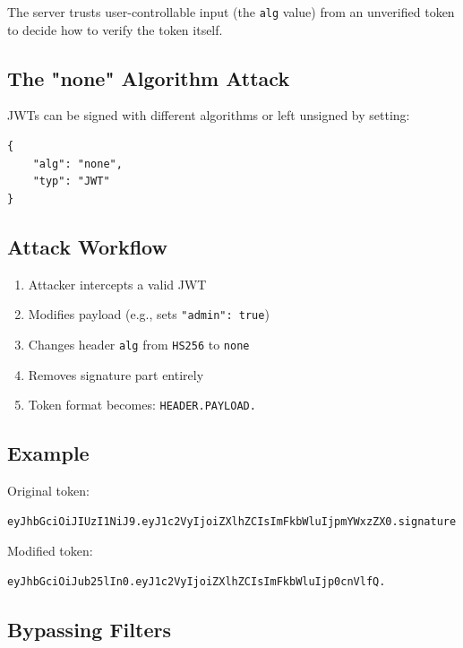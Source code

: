 \documentclass{article}
\begin{document}
\begin{attackbox}
The server trusts user-controllable input (the \texttt{alg} value) from an unverified token to decide how to verify the token itself.
\end{attackbox}

\subsection{The "none" Algorithm Attack}

JWTs can be signed with different algorithms or left unsigned by setting:

\begin{lstlisting}[caption=Unsecured JWT Header]
{
    "alg": "none",
    "typ": "JWT"
}
\end{lstlisting}

\subsection{Attack Workflow}

\begin{enumerate}
    \item Attacker intercepts a valid JWT
    \item Modifies payload (e.g., sets \texttt{"admin": true})
    \item Changes header \texttt{alg} from \texttt{HS256} to \texttt{none}
    \item Removes signature part entirely
    \item Token format becomes: \texttt{HEADER.PAYLOAD.}
\end{enumerate}

\subsection{Example}

Original token:
\begin{verbatim}
eyJhbGciOiJIUzI1NiJ9.eyJ1c2VyIjoiZXlhZCIsImFkbWluIjpmYWxzZX0.signature
\end{verbatim}

Modified token:
\begin{verbatim}
eyJhbGciOiJub25lIn0.eyJ1c2VyIjoiZXlhZCIsImFkbWluIjp0cnVlfQ.
\end{verbatim}

\subsection{Bypassing Filters}
\end{document}
